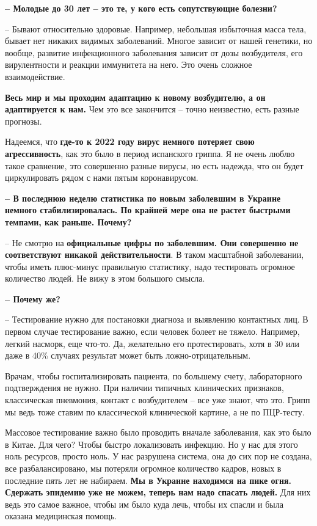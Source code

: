 \textbf{– Молодые до 30 лет – это те, у кого есть сопутствующие болезни?}

– Бывают относительно здоровые. Например, небольшая избыточная масса тела,
бывает нет никаких видимых заболеваний. Многое зависит от нашей генетики, но
вообще, развитие инфекционного заболевания зависит от дозы возбудителя, его
вирулентности и реакции иммунитета на него. Это очень сложное взаимодействие.

\textbf{Весь мир и мы проходим адаптацию к новому возбудителю, а он адаптируется к нам.}
Чем это все закончится – точно неизвестно, есть разные прогнозы.

Надеемся, что \textbf{где-то к 2022 году вирус немного потеряет свою агрессивность}, как
это было в период испанского гриппа. Я не очень люблю такое сравнение, это
совершенно разные вирусы, но есть надежда, что он будет циркулировать рядом с
нами пятым коронавирусом.

\textbf{– В последнюю неделю статистика по новым заболевшим в Украине немного
стабилизировалась. По крайней мере она не растет быстрыми темпами, как раньше.
Почему?}

– Не смотрю на \textbf{официальные цифры по заболевшим. Они совершенно не соответствуют
никакой действительности}. В таком масштабной заболевании, чтобы иметь
плюс-минус правильную статистику, надо тестировать огромное количество людей.
Не вижу в этом большого смысла.

\textbf{– Почему же?}

– Тестирование нужно для постановки диагноза и выявлению контактных лиц. В
первом случае тестирование важно, если человек болеет не тяжело. Например,
легкий насморк, еще что-то. Да, желательно его протестировать, хотя в 30 или
даже в 40\% случаях результат может быть ложно-отрицательным.

Врачам, чтобы госпитализировать пациента, по большему счету, лабораторного
подтверждения не нужно. При наличии типичных клинических признаков,
классическая пневмония, контакт с возбудителем – все уже знают, что это. Грипп
мы ведь тоже ставим по классической клинической картине, а не по ПЦР-тесту.

Массовое тестирование важно было проводить вначале заболевания, как это было в
Китае. Для чего? Чтобы быстро локализовать инфекцию. Но у нас для этого ноль
ресурсов, просто ноль. У нас разрушена система, она до сих пор не создана, все
разбалансировано, мы потеряли огромное количество кадров, новых в последние
пять лет не набираем. \textbf{Мы в Украине находимся на пике огня. Сдержать эпидемию
уже не можем, теперь нам надо спасать людей.} Для них ведь это самое важное,
чтобы им было куда лечь, чтобы их спасли и была оказана медицинская помощь.

